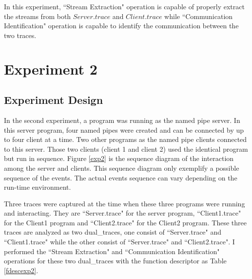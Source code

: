 In this experiment, ``Stream Extraction" operation is capable of properly extract the streams from both $Server.trace$ and $Client.trace$ while ``Communication Identification" operation is capable to identify the communication between the two traces.



\section{Experiment 2}
\subsection{Experiment Design}
In the second experiment, a program was running as the named pipe server. In this server program, four named pipes were created and can be connected by up to four client at a time. Two other programs as the named pipe clients connected to this server. Those two clients (client 1 and client 2) used the identical program but run in sequence. Figure \ref{exp2} is the sequence diagram of the interaction among the server and clients. This sequence diagram only exemplify a possible sequence of the events. The actual events sequence can vary depending on the run-time environment. 


Three traces were captured at the time when these three programs were running and interacting. They are ``Server.trace" for the server program, ``Client1.trace" for the Client1 program and ``Client2.trace" for the Client2 program. These three traces are analyzed as two dual\_traces, one consist of ``Server.trace" and ``Client1.trace" while the other consist of ``Server.trace" and ``Client2.trace". I performed the ``Stream Extraction" and ``Communication Identification" operations for these two dual\_traces with the function descriptor as Table \ref{fdescexp2}.



